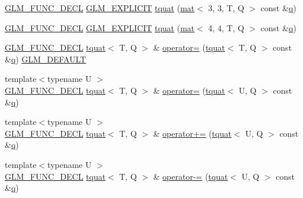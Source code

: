 \begin{DoxyCompactItemize}
\hyperlink{setup_8hpp_ab2d052de21a70539923e9bcbf6e83a51}{G\+L\+M\+\_\+\+F\+U\+N\+C\+\_\+\+D\+E\+CL} \hyperlink{setup_8hpp_a6c74f5a5e7b134ab69023ff9a30d4d5d}{G\+L\+M\+\_\+\+E\+X\+P\+L\+I\+C\+IT} \hyperlink{structglm_1_1tquat_a38ce1c324ea9484c6d4f73785c9bea35}{tquat} (\hyperlink{structglm_1_1mat}{mat}$<$ 3, 3, T, Q $>$ const \&\hyperlink{_s_d_l__opengl_8h_a8fc1e7b9baaae687804c7eed46ca09c6}{q})
\item 
\hyperlink{setup_8hpp_ab2d052de21a70539923e9bcbf6e83a51}{G\+L\+M\+\_\+\+F\+U\+N\+C\+\_\+\+D\+E\+CL} \hyperlink{setup_8hpp_a6c74f5a5e7b134ab69023ff9a30d4d5d}{G\+L\+M\+\_\+\+E\+X\+P\+L\+I\+C\+IT} \hyperlink{structglm_1_1tquat_adf5a3881bf63586dd6a1c26f59fee6c8}{tquat} (\hyperlink{structglm_1_1mat}{mat}$<$ 4, 4, T, Q $>$ const \&\hyperlink{_s_d_l__opengl_8h_a8fc1e7b9baaae687804c7eed46ca09c6}{q})
\item 
\hyperlink{setup_8hpp_ab2d052de21a70539923e9bcbf6e83a51}{G\+L\+M\+\_\+\+F\+U\+N\+C\+\_\+\+D\+E\+CL} \hyperlink{structglm_1_1tquat}{tquat}$<$ T, Q $>$ \& \hyperlink{structglm_1_1tquat_a2f7cf076f1398d0190228255239d9cc0}{operator=} (\hyperlink{structglm_1_1tquat}{tquat}$<$ T, Q $>$ const \&\hyperlink{_s_d_l__opengl_8h_a8fc1e7b9baaae687804c7eed46ca09c6}{q}) \hyperlink{setup_8hpp_aefce7051c376a64ba89fa93a9f63bc2c}{G\+L\+M\+\_\+\+D\+E\+F\+A\+U\+LT}
\item 
{\footnotesize template$<$typename U $>$ }\\\hyperlink{setup_8hpp_ab2d052de21a70539923e9bcbf6e83a51}{G\+L\+M\+\_\+\+F\+U\+N\+C\+\_\+\+D\+E\+CL} \hyperlink{structglm_1_1tquat}{tquat}$<$ T, Q $>$ \& \hyperlink{structglm_1_1tquat_ab460ca35b5d2a4afe8fc79106943f456}{operator=} (\hyperlink{structglm_1_1tquat}{tquat}$<$ U, Q $>$ const \&\hyperlink{_s_d_l__opengl_8h_a8fc1e7b9baaae687804c7eed46ca09c6}{q})
\item 
{\footnotesize template$<$typename U $>$ }\\\hyperlink{setup_8hpp_ab2d052de21a70539923e9bcbf6e83a51}{G\+L\+M\+\_\+\+F\+U\+N\+C\+\_\+\+D\+E\+CL} \hyperlink{structglm_1_1tquat}{tquat}$<$ T, Q $>$ \& \hyperlink{structglm_1_1tquat_af04015f0ca99c3792a7af3061d3508bb}{operator+=} (\hyperlink{structglm_1_1tquat}{tquat}$<$ U, Q $>$ const \&\hyperlink{_s_d_l__opengl_8h_a8fc1e7b9baaae687804c7eed46ca09c6}{q})
\item 
{\footnotesize template$<$typename U $>$ }\\\hyperlink{setup_8hpp_ab2d052de21a70539923e9bcbf6e83a51}{G\+L\+M\+\_\+\+F\+U\+N\+C\+\_\+\+D\+E\+CL} \hyperlink{structglm_1_1tquat}{tquat}$<$ T, Q $>$ \& \hyperlink{structglm_1_1tquat_a1f48d26214f6efcb8f1c6a222e45fae1}{operator-\/=} (\hyperlink{structglm_1_1tquat}{tquat}$<$ U, Q $>$ const \&\hyperlink{_s_d_l__opengl_8h_a8fc1e7b9baaae687804c7eed46ca09c6}{q})

\end{DoxyCompactItemize}
